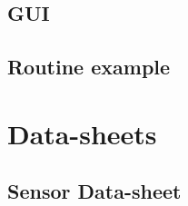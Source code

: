 \documentclass[12pt,a4paper]{article}
\begin{document}
\subsection{GUI}

\subsection{Routine example}

\section{Data-sheets}
\subsection{Sensor Data-sheet }\label{app:PMW3660}

%
\end{document}
